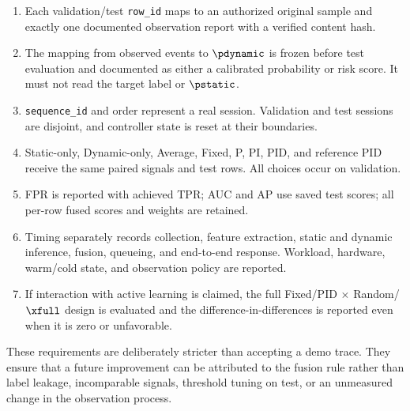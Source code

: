 \begin{enumerate}
    \item Each validation/test \texttt{row\_id} maps to an authorized original sample and
    exactly one documented observation report with a verified content hash.
    \item The mapping from observed events to $\pdynamic$ is frozen before test
    evaluation and documented as either a calibrated probability or risk score.
    It must not read the target label or $\pstatic$.
    \item \texttt{sequence\_id} and order represent a real session. Validation and test
    sessions are disjoint, and controller state is reset at their boundaries.
    \item Static-only, Dynamic-only, Average, Fixed, P, PI, PID, and reference PID
    receive the same paired signals and test rows. All choices occur on
    validation.
    \item FPR is reported with achieved TPR; AUC and AP use saved test scores; all
    per-row fused scores and weights are retained.
    \item Timing separately records collection, feature extraction, static and
    dynamic inference, fusion, queueing, and end-to-end response. Workload,
    hardware, warm/cold state, and observation policy are reported.
    \item If interaction with active learning is claimed, the full
    Fixed/PID $\times$ Random/$\xfull$ design is evaluated and the
    difference-in-differences is reported even when it is zero or unfavorable.
\end{enumerate}

These requirements are deliberately stricter than accepting a demo trace. They
ensure that a future improvement can be attributed to the fusion rule rather than
label leakage, incomparable signals, threshold tuning on test, or an unmeasured
change in the observation process.
